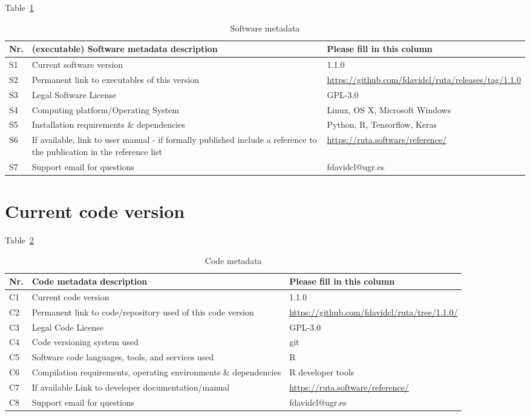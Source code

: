 \documentclass[
	fontsize=11pt, %
	twoside=false, %
	open=any, %
	secnumdepth=1, %
]{kaobook}
\newcommand{\revised}[1]{#1}
\begin{document}
Table~\ref{tbl.exe}

\begin{table}[!h]
\begin{tabular}{|l|p{6.5cm}|p{6.5cm}|}
\hline
\textbf{Nr.} & \textbf{(executable) Software metadata description} & \textbf{Please fill in this column} \\
\hline
S1 & Current software version & 1.\revised{1.0} \\
\hline
S2 & Permanent link to executables of this version  & \revised{\url{https://github.com/fdavidcl/ruta/releases/tag/1.1.0}} \\
\hline
S3 & Legal Software License & GPL-3.0 \\
\hline
S4 & Computing platform/Operating System & Linux, OS X, Microsoft Windows \\
\hline
S5 & Installation requirements \& dependencies & Python, R, Tensorflow, Keras \\
\hline
S6 & If available, link to user manual - if formally published include a reference to the publication in the reference list & \url{https://ruta.software/reference/} \\
\hline
S7 & Support email for questions & fdavidcl@ugr.es \\
\hline
\end{tabular}
\caption{Software metadata}
\label{tbl.exe} 
\end{table}

\section*{Current code version}

Table~\ref{tbl.code}

\begin{table}[!h]
\begin{tabular}{|l|p{6.5cm}|p{6.5cm}|}
\hline
\textbf{Nr.} & \textbf{Code metadata description} & \textbf{Please fill in this column} \\
\hline
C1 & Current code version & 1.\revised{1.0} \\
\hline
C2 & Permanent link to code/repository used of this code version & \revised{\url{https://github.com/fdavidcl/ruta/tree/1.1.0/}} \\
\hline
C3 & Legal Code License   & GPL-3.0 \\
\hline
C4 & Code versioning system used & git \\
\hline
C5 & Software code languages, tools, and services used & R \\
\hline
C6 & Compilation requirements, operating environments \& dependencies & R developer tools \\
\hline
C7 & If available Link to developer documentation/manual & \url{https://ruta.software/reference/} \\
\hline
C8 & Support email for questions & fdavidcl@ugr.es \\
\hline
\end{tabular}
\caption{Code metadata}
\label{tbl.code} 
\end{table}
\end{document}
